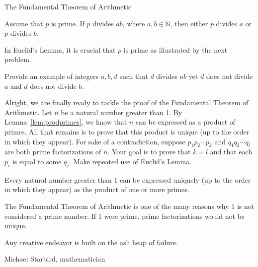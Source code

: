 \begin{section}{The Fundamental Theorem of Arithmetic}
\begin{theorem}\label{thm:Euclid}
Assume that $p$ is prime.  If $p$ divides $ab$, where $a,b\in\mathbb{N}$, then either $p$ divides $a$ or $p$ divides $b$.
\end{theorem}

In Euclid's Lemma, it is crucial that $p$ is prime as illustrated by the next problem.

\begin{problem}
Provide an example of integers $a, b, d$ such that $d$ divides $ab$ yet $d$ does not divide $a$ and $d$ does not divide $b$.
\end{problem}

Alright, we are finally ready to tackle the proof of the Fundamental Theorem of Arithmetic. Let $n$ be a natural number greater than 1. By Lemma~\ref{lem:prodprimes}, we know that $n$ can be expressed as a product of primes.  All that remains is to prove that this product is unique (up to the order in which they appear). For sake of a contradiction, suppose $p_1 p_2 \cdots p_k$ and $q_1 q_2 \cdots q_l$ are both prime factorizations of $n$.  Your goal is to prove that $k=l$ and that each $p_i$ is equal to some $q_j$. Make repeated use of Euclid's Lemma.

\begin{theorem}\label{thm:FTA}
Every natural number greater than 1 can be expressed uniquely (up to the order in which they appear) as the product of one or more primes.
\end{theorem}

The Fundamental Theorem of Arithmetic is one of the many reasons why 1 is not considered a prime number. If 1 were prime, prime factorizations would not be unique.

\epigraph{Any creative endeavor is built on the ash heap of failure.}{Michael Starbird, mathematician}

\end{section}